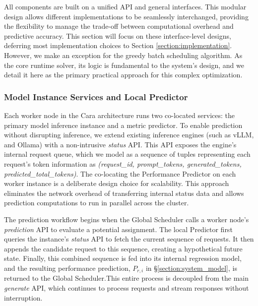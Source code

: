 \documentclass[letterpaper, anonymous, twocolumn, 10pt]{article}
\begin{document}
All components are built on a unified API and general interfaces. This modular design allows different implementations to be seamlessly interchanged, providing the flexibility to manage the trade-off between computational overhead and predictive accuracy. This section will focus on these interface-level designs, deferring most implementation choices to Section \ref{section:implementation}. However, we make an exception for the greedy batch scheduling algorithm. As the core runtime solver, its logic is fundamental to the system's design, and we detail it here as the primary practical approach for this complex optimization.

\subsubsection{Model Instance Services and Local Predictor}

Each worker node in the Cara architecture runs two co-located services: the primary model inference instance and a metric predictor. To enable prediction without disrupting inference, we extend existing inference engines (such as vLLM, and Ollama) with a non-intrusive \textit{status} API. This API exposes the engine's internal request queue, which we model as a sequence of tuples representing each request's token information as \textit{(request\_id, prompt\_tokens, generated\_tokens, predicted\_total\_tokens)}. The co-locating the Performance Predictor on each worker instance is a deliberate design choice for scalability. This approach eliminates the network overhead of transferring internal status data and allows prediction computations to run in parallel across the cluster.

The prediction workflow begins when the Global Scheduler calls a worker node's \textit{prediction} API to evaluate a potential assignment. The local Predictor first queries the instance's \textit{status} API to fetch the current sequence of requests. It then appends the candidate request to this sequence, creating a hypothetical future state. Finally, this combined sequence is fed into its internal regression model, and the resulting performance prediction, $P_{r,i}$ in \S \ref{section:system_model},  is returned to the Global Scheduler.This entire process is decoupled from the main \textit{generate} API, which continues to process requests and stream responses without interruption.
\end{document}
